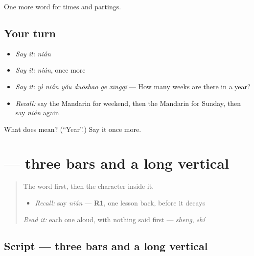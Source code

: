 \begin{grammarlens}[title={What you've built}]
One more word for times and partings.
\end{grammarlens}

\subsection*{Your turn}
\begin{itemize}
\raggedright
  \item \emph{Say it:} \emph{nián}
  \item \emph{Say it:} \emph{nián}, once more
  \item \emph{Say it:} \emph{yì nián yǒu duōshao ge xīngqī} — How many weeks are there in a year?
  \item \emph{Recall:} say the Mandarin for weekend, then the Mandarin for Sunday, then say \emph{nián} again
\end{itemize}

\begin{tcolorbox}[breakable,colback=teal!4,colframe=teal!35!black,title={Before you move on}]
What does  mean? (\textquotedblleft{}Year\textquotedblright{}.) Say it once more.
\end{tcolorbox}
\section[\texorpdfstring{\zh{年} (nián)}{年 (nián)}]{ — three bars and a long vertical}

\label{lesson:ZH-W47-nian}



\begin{quote}
The word first, then the character inside it.

\begin{itemize}
\raggedright
  \item \emph{Recall:} say \emph{nián} — \textbf{R1}, one lesson back, before it decays
\end{itemize}

\begin{quote}
 
\end{quote}

\emph{Read it:} each one aloud, with nothing said first — \emph{shēng}, \emph{shí}
\end{quote}

\subsection*{Script — three bars and a long vertical}

